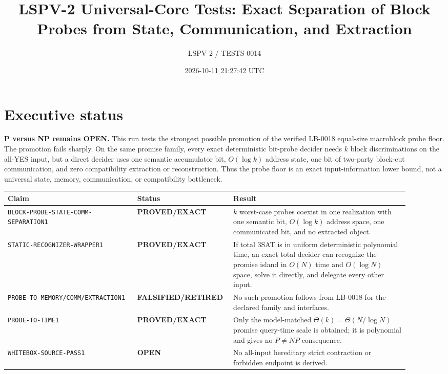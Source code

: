 \documentclass[11pt]{article}
\title{LSPV-2 Universal-Core Tests: Exact Separation of Block Probes from State, Communication, and Extraction}
\author{LSPV-2 / TESTS-0014}
\date{2026-10-11 21:27:42 UTC}
\newcommand{\Status}[1]{\textbf{#1}}
\begin{document}
\sloppy
\maketitle

\section*{Executive status}

\noindent\Status{P versus NP remains OPEN.}
This run tests the strongest possible promotion of the verified LB-0018
equal-size macroblock probe floor.  The promotion fails sharply.  On the same
promise family, every exact deterministic bit-probe decider needs $k$ block
discriminations on the all-YES input, but a direct decider uses one semantic
accumulator bit, $O(\log k)$ address state, one bit of two-party block-cut
communication, and zero compatibility extraction or reconstruction.  Thus the
probe floor is an exact input-information lower bound, not a universal state,
memory, communication, or compatibility bottleneck.

\begin{center}
\begin{tabular}{p{0.31\linewidth}p{0.18\linewidth}p{0.42\linewidth}}
\toprule
Claim & Status & Result \\
\midrule
\texttt{BLOCK-PROBE-STATE-COMM-SEPARATION1} & \Status{PROVED/EXACT} &
$k$ worst-case probes coexist in one realization with one semantic bit,
$O(\log k)$ address space, one communicated bit, and no extracted object. \\
\texttt{STATIC-RECOGNIZER-WRAPPER1} & \Status{PROVED/EXACT} &
If total $3$SAT is in uniform deterministic polynomial time, an exact total
decider can recognize the promise island in $O(N)$ time and $O(\log N)$ space,
solve it directly, and delegate every other input. \\
\texttt{PROBE-TO-MEMORY/COMM/EXTRACTION1} & \Status{FALSIFIED/RETIRED} &
No such promotion follows from LB-0018 for the declared family and interfaces. \\
\texttt{PROBE-TO-TIME1} & \Status{PROVED/EXACT} &
Only the model-matched $\Theta(k)=\Theta(N/\log N)$ promise query-time scale is
obtained; it is polynomial and gives no $P\ne NP$ consequence. \\
\texttt{WHITEBOX-SOURCE-PASS1} & \Status{OPEN} &
No all-input hereditary strict contraction or forbidden endpoint is derived. \\
\bottomrule
\end{tabular}
\end{center}
\end{document}
